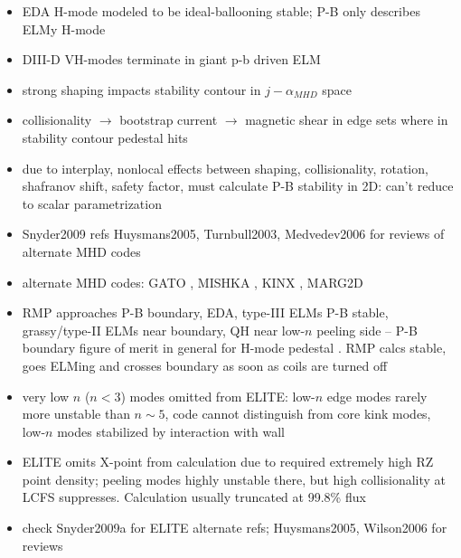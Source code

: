 \begin{itemize}
 \item EDA H-mode modeled to be ideal-ballooning stable; P-B only describes ELMy H-mode \cite{Mossessian2002}
 \item DIII-D VH-modes terminate in giant p-b driven ELM \cite{Turnbull2003}
 \item strong shaping impacts stability contour in $j-\alpha_{MHD}$ space \cite{Snyder2009}
 \item collisionality $\rightarrow$ bootstrap current $\rightarrow$ magnetic shear in edge sets where in stability contour pedestal hits \cite{Snyder2009}
 \item due to interplay, nonlocal effects between shaping, collisionality, rotation, shafranov shift, safety factor, must calculate P-B stability in 2D: can't reduce to scalar parametrization \cite{Snyder2009}
 \item Snyder2009 refs Huysmans2005, Turnbull2003, Medvedev2006 \cite{Huysmans2005,Turnbull2003,Medvedev2006} for reviews of alternate MHD codes
 \item alternate MHD codes: GATO \cite{Bernard1981}, MISHKA \cite{Huysmans2001,Mikhailovskii1997}, KINX \cite{Degtyarev1997,Medvedev2006}, MARG2D \cite{Aiba2006,Aiba2007}
 \item RMP approaches P-B boundary, EDA, type-III ELMs P-B stable, grassy/type-II ELMs near boundary, QH near low-$n$ peeling side -- P-B boundary figure of merit in general for H-mode pedestal \cite{Snyder2009}.  RMP calcs stable, goes ELMing and crosses boundary as soon as coils are turned off \cite{Snyder2009a}
 \item very low $n$ ($n < 3$) modes omitted from ELITE: low-$n$ edge modes rarely more unstable than $n \sim 5$, code cannot distinguish from core kink modes, low-$n$ modes stabilized by interaction with wall \cite{Snyder2009}
 \item ELITE omits X-point from calculation due to required extremely high RZ point density; peeling modes highly unstable there, but high collisionality at LCFS suppresses.  Calculation usually truncated at 99.8\% flux \cite{Snyder2009a}
 \item check Snyder2009a for ELITE alternate refs; Huysmans2005, Wilson2006 for reviews \cite{Snyder2009a,Huysmans2005,Wilson2006}
\end{itemize}

